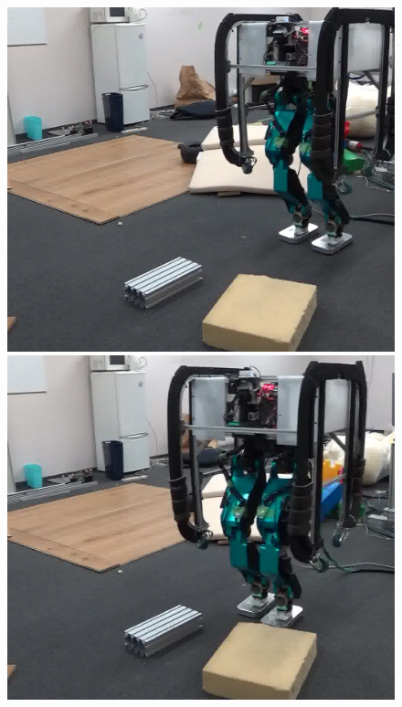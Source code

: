 \documentclass[twocolumn]{preport}
\begin{document}
\begin{figure}[tbh]
  \centering
  \begin{minipage}{0.24\columnwidth}
    \includegraphics[width=0.95\columnwidth]{checksoft05}
  \end{minipage}
  \begin{minipage}{0.24\columnwidth}
    \includegraphics[width=0.95\columnwidth]{checksoft13}
  \end{minipage}
  \begin{minipage}{0.24\columnwidth}

\end{minipage}
\end{figure}
\end{document}

